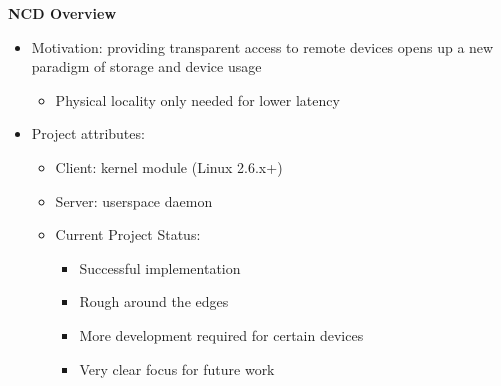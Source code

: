 \documentclass[handout]{beamer}
\begin{document}
\begin{frame}{\bf NCD Overview}
  \begin{itemize}
    \item<1-> Motivation: providing transparent access to remote devices opens up a new paradigm of storage and device usage
    \begin{itemize}
      \item<2-> Physical locality only needed for lower latency
    \end{itemize}
    \item<3-> Project attributes:
    \begin{itemize}
      \item<4-> Client: kernel module (Linux 2.6.x+)
      \item<5-> Server: userspace daemon
      \item<6-> Current Project Status:
        \begin{itemize}
          \item<7-> Successful implementation
          \item<8-> Rough around the edges
          \item<9-> More development required for certain devices
          \item<10-> Very clear focus for future work
        \end{itemize}
      \end{itemize}
  \end{itemize}
\end{frame}
\end{document}
